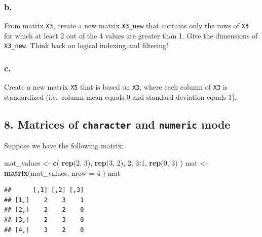 \documentclass[]{article}
\newenvironment{Shaded}{\begin{snugshade}}{\end{snugshade}}
\newcommand{\DataTypeTok}[1]{\textcolor[rgb]{0.13,0.29,0.53}{#1}}
\newcommand{\DecValTok}[1]{\textcolor[rgb]{0.00,0.00,0.81}{#1}}
\newcommand{\KeywordTok}[1]{\textcolor[rgb]{0.13,0.29,0.53}{\textbf{#1}}}
\newcommand{\NormalTok}[1]{#1}
\newcommand{\OperatorTok}[1]{\textcolor[rgb]{0.81,0.36,0.00}{\textbf{#1}}}
\newcommand{\StringTok}[1]{\textcolor[rgb]{0.31,0.60,0.02}{#1}}
\begin{document}
\hypertarget{b.-4}{%
\subsubsection{b.}\label{b.-4}}

From matrix \texttt{X3}, create a new matrix \texttt{X3\_new} that
contains only the rows of \texttt{X3} for which at least 2 out of the 4
values are greater than 1. Give the dimensions of \texttt{X3\_new}.
Think back on logical indexing and filtering!

\hypertarget{c.-4}{%
\subsubsection{c.}\label{c.-4}}

Create a new matrix \texttt{X5} that is based on \texttt{X3}, where each
column of \texttt{X3} is standardized (i.e.~column mean equals \(0\) and
standard deviation equals \(1\)).

\hypertarget{matrices-of-character-and-numeric-mode}{%
\subsection{\texorpdfstring{8. Matrices of \texttt{character} and
\texttt{numeric}
mode}{8. Matrices of character and numeric mode}}\label{matrices-of-character-and-numeric-mode}}

Suppose we have the following matrix:

\begin{Shaded}
\begin{Highlighting}[]
\NormalTok{mat_values <-}\StringTok{ }\KeywordTok{c}\NormalTok{(}
  \KeywordTok{rep}\NormalTok{(}\DecValTok{2}\NormalTok{, }\DecValTok{3}\NormalTok{), }
  \KeywordTok{rep}\NormalTok{(}\DecValTok{3}\NormalTok{, }\DecValTok{2}\NormalTok{), }
  \DecValTok{2}\NormalTok{, }\DecValTok{3}\OperatorTok{:}\DecValTok{1}\NormalTok{, }
  \KeywordTok{rep}\NormalTok{(}\DecValTok{0}\NormalTok{, }\DecValTok{3}\NormalTok{)}
\NormalTok{)}
\NormalTok{mat <-}\StringTok{ }\KeywordTok{matrix}\NormalTok{(mat_values, }\DataTypeTok{nrow =} \DecValTok{4}
\NormalTok{)}
\NormalTok{mat}
\end{Highlighting}
\end{Shaded}

\begin{verbatim}
##      [,1] [,2] [,3]
## [1,]    2    3    1
## [2,]    2    2    0
## [3,]    2    3    0
## [4,]    3    2    0
\end{verbatim}
\end{document}
